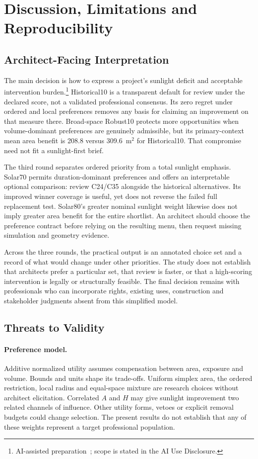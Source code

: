 \documentclass{llncs}
\newcommand{\aidraft}{\footnote{AI-assisted preparation~\cite{openai2026}; scope is stated in the AI Use Disclosure.}}
\begin{document}
\section{Discussion, Limitations and Reproducibility}
\subsection{Architect-Facing Interpretation}
The main decision is how to express a project's sunlight deficit and acceptable intervention burden.\aidraft{} Historical10 is a transparent default for review under the declared score, not a validated professional consensus. Its zero regret under ordered and local preferences removes any basis for claiming an improvement on that measure there. Broad-space Robust10 protects more opportunities when volume-dominant preferences are genuinely admissible, but its primary-context mean area benefit is 208.8 versus 309.6~m$^2$ for Historical10. That compromise need not fit a sunlight-first brief.

The third round separates ordered priority from a total sunlight emphasis. Solar70 permits duration-dominant preferences and offers an interpretable optional comparison: review C24/C35 alongside the historical alternatives. Its improved winner coverage is useful, yet does not reverse the failed full replacement test. Solar80's greater nominal sunlight weight likewise does not imply greater area benefit for the entire shortlist. An architect should choose the preference contract before relying on the resulting menu, then request missing simulation and geometry evidence.

Across the three rounds, the practical output is an annotated choice set and a record of what would change under other priorities. The study does not establish that architects prefer a particular set, that review is faster, or that a high-scoring intervention is legally or structurally feasible. The final decision remains with professionals who can incorporate rights, existing uses, construction and stakeholder judgments absent from this simplified model.

\subsection{Threats to Validity}
\paragraph{Preference model.} Additive normalized utility assumes compensation between area, exposure and volume. Bounds and units shape its trade-offs. Uniform simplex area, the ordered restriction, local radius and equal-space mixture are research choices without architect elicitation. Correlated $A$ and $H$ may give sunlight improvement two related channels of influence. Other utility forms, vetoes or explicit removal budgets could change selection. The present results do not establish that any of these weights represent a target professional population.
\end{document}
